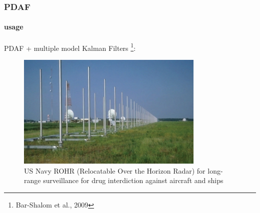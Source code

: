 %
%
%
%
%
%
%
%



\begin{frame}
\frametitle{PDAF}
\framesubtitle{usage}
\logoCSIPCPL\mypagenum
	PDAF + multiple model Kalman Filters \tiny{\footnote{Bar-Shalom et al., 2009}}:
	\begin{figure}
		\includegraphics[width=0.8\textwidth]{figs/TRK_PDAF_example_US_Navy_ROTHR.jpg}
		\caption {US Navy ROHR (Relocatable Over the Horizon Radar) for long-range surveillance for drug interdiction against aircraft and ships}
	\end{figure}
\end{frame}

